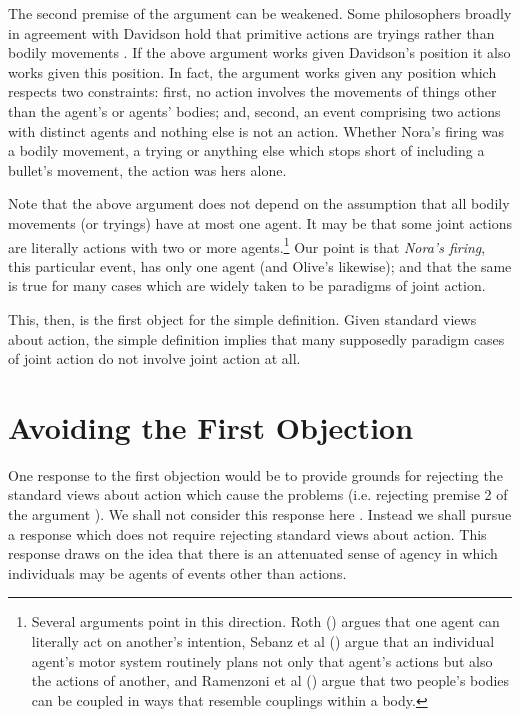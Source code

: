 \documentclass[12pt,a4paper]{extarticle}
\begin{document}
The second premise of the argument can be weakened.
Some philosophers broadly in agreement with Davidson hold that primitive actions are tryings rather than bodily movements \citep[e.g.][]{hornsby_actions_1980}.  
If the above argument works given Davidson's position it also works given this position.
In fact, the argument works given any position which respects two constraints: first, no action involves the movements of things other than the agent's or agents' bodies; and, second, an event comprising two actions with distinct agents and nothing else is not an action.
Whether Nora's firing was a bodily movement, a trying or anything else which stops short of including a bullet's movement, the action was hers alone.

Note that the above argument does not depend on the assumption that all bodily movements (or tryings) have at most one agent.
It may be that some joint actions are literally actions with two or more agents.\footnote{
Several arguments point in this direction.
Roth (\citeyear{Roth:2004ki}) argues that one agent can literally act on another's intention,
Sebanz et al (\citeyear{Sebanz:2005fk}) argue that an individual agent's motor system routinely plans not only that agent's actions but also the actions of another,
and 
Ramenzoni et al (\citeyear{ramenzoni_joint_2011}) argue that two people's bodies can be coupled in ways that resemble  couplings within a body. 
}
Our point is that \emph{Nora's firing}, this particular event, has only one agent  (and Olive's likewise); and that the same is true for many cases which are widely taken to be paradigms of joint action.

This, then, is the first object for the simple definition.
Given standard views about action, the simple definition implies that many supposedly paradigm cases of joint action do not involve joint action at all.



\section{Avoiding the First Objection}
One response to the first objection would be to provide grounds for rejecting the standard views about action which cause the problems (i.e. rejecting premise 2 of the argument ).
We shall not consider this response here \citep[but see][]{chant_unintentional_2007}.
Instead we shall pursue a response which does not require rejecting standard views about action.
This response draws on the idea that there is an attenuated sense of agency in which individuals may be agents of events other than actions.
\end{document}
